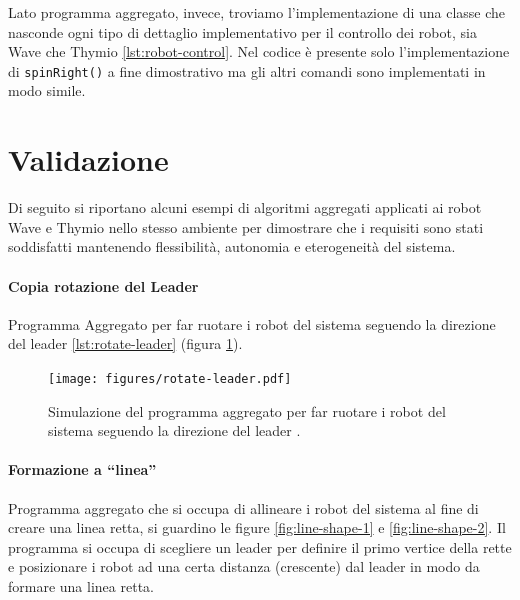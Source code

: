 \documentclass[12pt,a4paper,openright,twoside]{book}
\begin{document}
Lato programma aggregato, invece, troviamo l'implementazione di una classe che nasconde ogni tipo di dettaglio implementativo per il controllo dei robot, sia Wave che Thymio \cref{lst:robot-control}. Nel codice è presente solo l'implementazione di \verb|spinRight()| a fine dimostrativo ma gli altri comandi sono implementati in modo simile.



\section{Validazione}

Di seguito si riportano alcuni esempi di algoritmi aggregati applicati ai robot Wave e Thymio nello stesso ambiente per dimostrare che i requisiti sono stati soddisfatti mantenendo flessibilità, autonomia e eterogeneità del sistema.

\paragraph{Copia rotazione del Leader}
Programma Aggregato per far ruotare i robot del sistema seguendo la direzione del leader \cref{lst:rotate-leader} (figura \ref{fig:rotate-leader}).



\begin{figure}
    \centering
    \texttt{[image: figures/rotate-leader.pdf]}
    \caption{Simulazione del programma aggregato per far ruotare i robot del sistema seguendo la direzione del leader .}
    \label{fig:rotate-leader}
\end{figure}

\paragraph{Formazione a ``linea''}
Programma aggregato che si occupa di allineare i robot del sistema al fine di creare una linea retta, si guardino le figure \ref{fig:line-shape-1} e \ref{fig:line-shape-2}. Il programma si occupa di scegliere un leader per definire il primo vertice della rette e posizionare i robot ad una certa distanza (crescente) dal leader in modo da formare una linea retta.
\end{document}
